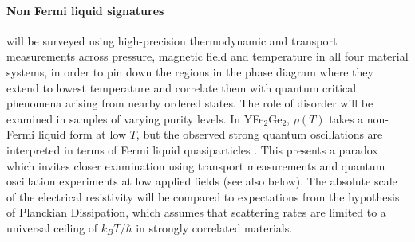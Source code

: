 \paragraph{Non Fermi liquid signatures} will be surveyed using high-precision thermodynamic and transport measurements across pressure, magnetic field and temperature in all four material systems, in order to pin down the regions in the phase diagram where they extend to lowest temperature and correlate them with quantum critical phenomena arising from nearby ordered states. The role of disorder will be examined in samples of varying purity levels. %
In YFe$_2$Ge$_2$, $\rho(T)$ takes a non-Fermi liquid form at low $T$, but the observed strong quantum oscillations are interpreted in terms of Fermi liquid quasiparticles \cite{baglo21}. %
This presents a paradox which invites closer examination using transport measurements and quantum oscillation experiments at low applied fields (see also below).
The absolute scale of the electrical resistivity will be compared to expectations from the hypothesis of Planckian Dissipation, which assumes that scattering rates are limited to a universal ceiling of $k_B T/\hbar$ in strongly correlated materials.




